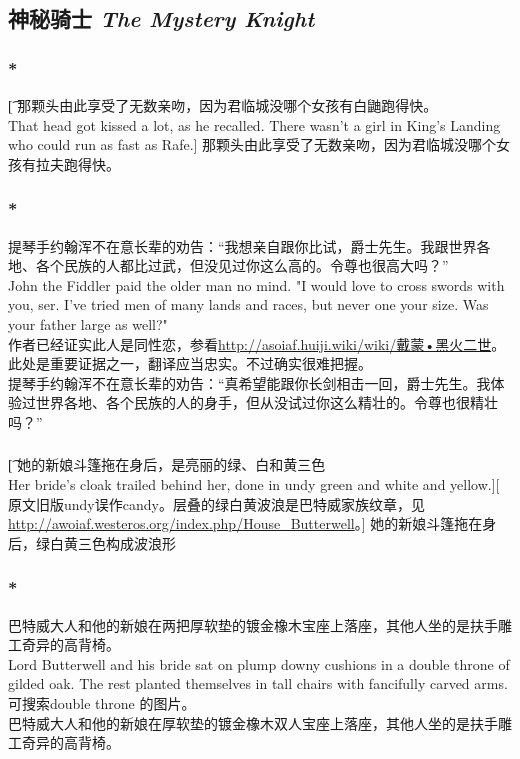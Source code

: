 \documentclass[12pt,a4paper]{article}
\newcommand{\h}[1]{{\color{red}#1}\\}
\newcommand{\la}[1]{{\color{blue}#1}\\}
\begin{document}
\subsection{神秘骑士 \emph{The Mystery Knight}}						
\subsubsection{\color{red}*}\t[	 	
	那颗头由此享受了无数亲吻，因为君临城没哪个女孩有白鼬跑得快。\\
	That head got kissed a lot, as he recalled. There wasn't a girl in King's Landing who could run as fast as Rafe.]
	那颗头由此享受了无数亲吻，因为君临城没哪个女孩有拉夫跑得快。
	
\subsubsection{\color{red}*}\la{
	提琴手约翰浑不在意长辈的劝告：“我想亲自跟你比试，爵士先生。我跟世界各地、各个民族的人都比过武，但没见过你这么高的。令尊也很高大吗？”\\
	John the Fiddler paid the older man no mind. "I would love to cross swords with you, ser. I've tried men of many lands and races, but never one your size. Was your father large as well?"}\h{
	作者已经证实此人是同性恋，参看\href{http://asoiaf.huiji.wiki/wiki/\%E6\%88\%B4\%E8\%92\%99\%C2\%B7\%E9\%BB\%91\%E7\%81\%AB\%E4\%BA\%8C\%E4\%B8\%96}{http://asoiaf.huiji.wiki/wiki/戴蒙•黑火二世}。此处是重要证据之一，翻译应当忠实。不过确实很难把握。}
	提琴手约翰浑不在意长辈的劝告：“真希望能跟你长剑相击一回，爵士先生。我体验过世界各地、各个民族的人的身手，但从没试过你这么精壮的。令尊也很精壮吗？”
	
\subsubsection{}\t[	 	
	她的新娘斗篷拖在身后，是亮丽的绿、白和黄三色\\
	Her bride's cloak trailed behind her, done in undy green and white and yellow.][
	原文旧版undy误作candy。层叠的绿白黄波浪是巴特威家族纹章，见\url{http://awoiaf.westeros.org/index.php/House_Butterwell}。]
	她的新娘斗篷拖在身后，绿白黄三色构成波浪形
	
\subsubsection{\color{red}*}\la{
	巴特威大人和他的新娘在两把厚软垫的镀金橡木宝座上落座，其他人坐的是扶手雕工奇异的高背椅。\\
	Lord Butterwell and his bride sat on plump downy cushions in a double throne of gilded oak. The rest planted themselves in tall chairs with fancifully carved arms.}\h{
	可搜索double throne 的图片。}
	巴特威大人和他的新娘在厚软垫的镀金橡木双人宝座上落座，其他人坐的是扶手雕工奇异的高背椅。
	
\end{document}
